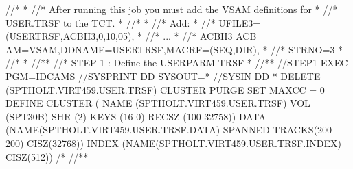 \documentclass[letterpaper,10pt,english]{sphinxmanual}
\begin{document}
\begin{sphinxVerbatim}[commandchars=\\\{\}]
//*                                                                *
//* After running this job you must add the VSAM definitions for   *
//* USER.TRSF to the TCT.                                          *
//*                                                                *
//* Add:\PYGZhy{}                                                          *
//*            UFILE3=(USERTRSF,ACBH3,0,10,05),                    *
//*            ...                                                 *
//*   ACBH3    ACB   AM=VSAM,DDNAME=USERTRSF,MACRF=(SEQ,DIR),      *
//*            STRNO=3                                             *
//*                                                                *
//*\PYGZhy{}\PYGZhy{}\PYGZhy{}\PYGZhy{}\PYGZhy{}\PYGZhy{}\PYGZhy{}\PYGZhy{}\PYGZhy{}\PYGZhy{}\PYGZhy{}\PYGZhy{}\PYGZhy{}\PYGZhy{}\PYGZhy{}\PYGZhy{}\PYGZhy{}\PYGZhy{}\PYGZhy{}\PYGZhy{}\PYGZhy{}\PYGZhy{}\PYGZhy{}\PYGZhy{}\PYGZhy{}\PYGZhy{}\PYGZhy{}\PYGZhy{}\PYGZhy{}\PYGZhy{}\PYGZhy{}\PYGZhy{}\PYGZhy{}\PYGZhy{}\PYGZhy{}\PYGZhy{}\PYGZhy{}\PYGZhy{}\PYGZhy{}\PYGZhy{}\PYGZhy{}\PYGZhy{}\PYGZhy{}\PYGZhy{}\PYGZhy{}\PYGZhy{}\PYGZhy{}\PYGZhy{}\PYGZhy{}\PYGZhy{}\PYGZhy{}\PYGZhy{}\PYGZhy{}\PYGZhy{}\PYGZhy{}\PYGZhy{}\PYGZhy{}\PYGZhy{}\PYGZhy{}\PYGZhy{}\PYGZhy{}\PYGZhy{}\PYGZhy{}\PYGZhy{}*
//* STEP 1 : Define the USERPARM TRSF                              *
//*\PYGZhy{}\PYGZhy{}\PYGZhy{}\PYGZhy{}\PYGZhy{}\PYGZhy{}\PYGZhy{}\PYGZhy{}\PYGZhy{}\PYGZhy{}\PYGZhy{}\PYGZhy{}\PYGZhy{}\PYGZhy{}\PYGZhy{}\PYGZhy{}\PYGZhy{}\PYGZhy{}\PYGZhy{}\PYGZhy{}\PYGZhy{}\PYGZhy{}\PYGZhy{}\PYGZhy{}\PYGZhy{}\PYGZhy{}\PYGZhy{}\PYGZhy{}\PYGZhy{}\PYGZhy{}\PYGZhy{}\PYGZhy{}\PYGZhy{}\PYGZhy{}\PYGZhy{}\PYGZhy{}\PYGZhy{}\PYGZhy{}\PYGZhy{}\PYGZhy{}\PYGZhy{}\PYGZhy{}\PYGZhy{}\PYGZhy{}\PYGZhy{}\PYGZhy{}\PYGZhy{}\PYGZhy{}\PYGZhy{}\PYGZhy{}\PYGZhy{}\PYGZhy{}\PYGZhy{}\PYGZhy{}\PYGZhy{}\PYGZhy{}\PYGZhy{}\PYGZhy{}\PYGZhy{}\PYGZhy{}\PYGZhy{}\PYGZhy{}\PYGZhy{}\PYGZhy{}*
//STEP1   EXEC PGM=IDCAMS
//SYSPRINT DD  SYSOUT=*
//SYSIN    DD  *
DELETE  (SPTHOLT.VIRT459.USER.TRSF) CLUSTER PURGE
SET MAXCC = 0
DEFINE CLUSTER (\PYGZhy{}
      NAME (SPTHOLT.VIRT459.USER.TRSF) \PYGZhy{}
      VOL (SPT30B) \PYGZhy{}
      SHR (2) \PYGZhy{}
      KEYS (16 0) \PYGZhy{}
      RECSZ (100 32758)) \PYGZhy{}
   DATA (NAME(SPTHOLT.VIRT459.USER.TRSF.DATA) \PYGZhy{}
         SPANNED \PYGZhy{}
         TRACKS(200 200) \PYGZhy{}
         CISZ(32768)) \PYGZhy{}
   INDEX (NAME(SPTHOLT.VIRT459.USER.TRSF.INDEX) \PYGZhy{}
         CISZ(512))
/*
//*\PYGZhy{}\PYGZhy{}\PYGZhy{}\PYGZhy{}\PYGZhy{}\PYGZhy{}\PYGZhy{}\PYGZhy{}\PYGZhy{}\PYGZhy{}\PYGZhy{}\PYGZhy{}\PYGZhy{}\PYGZhy{}\PYGZhy{}\PYGZhy{}\PYGZhy{}\PYGZhy{}\PYGZhy{}\PYGZhy{}\PYGZhy{}\PYGZhy{}\PYGZhy{}\PYGZhy{}\PYGZhy{}\PYGZhy{}\PYGZhy{}\PYGZhy{}\PYGZhy{}\PYGZhy{}\PYGZhy{}\PYGZhy{}\PYGZhy{}\PYGZhy{}\PYGZhy{}\PYGZhy{}\PYGZhy{}\PYGZhy{}\PYGZhy{}\PYGZhy{}\PYGZhy{}\PYGZhy{}\PYGZhy{}\PYGZhy{}\PYGZhy{}\PYGZhy{}\PYGZhy{}\PYGZhy{}\PYGZhy{}\PYGZhy{}\PYGZhy{}\PYGZhy{}\PYGZhy{}\PYGZhy{}\PYGZhy{}\PYGZhy{}\PYGZhy{}\PYGZhy{}\PYGZhy{}\PYGZhy{}\PYGZhy{}\PYGZhy{}\PYGZhy{}\PYGZhy{}*

\end{sphinxVerbatim}
\end{document}
